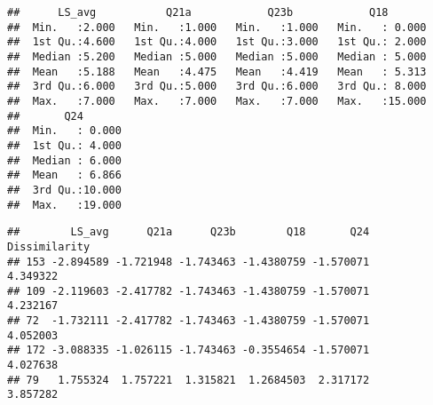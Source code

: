 \documentclass[
]{article}
\newenvironment{Shaded}{\begin{snugshade}}{\end{snugshade}}
\newcommand{\CommentTok}[1]{\textcolor[rgb]{0.56,0.35,0.01}{\textit{#1}}}
\newcommand{\DecValTok}[1]{\textcolor[rgb]{0.00,0.00,0.81}{#1}}
\newcommand{\FunctionTok}[1]{\textcolor[rgb]{0.00,0.00,0.00}{#1}}
\newcommand{\NormalTok}[1]{#1}
\newcommand{\OtherTok}[1]{\textcolor[rgb]{0.56,0.35,0.01}{#1}}
\newcommand{\SpecialCharTok}[1]{\textcolor[rgb]{0.00,0.00,0.00}{#1}}
\newcommand{\StringTok}[1]{\textcolor[rgb]{0.31,0.60,0.02}{#1}}
\begin{document}
\begin{verbatim}
##      LS_avg           Q21a            Q23b            Q18        
##  Min.   :2.000   Min.   :1.000   Min.   :1.000   Min.   : 0.000  
##  1st Qu.:4.600   1st Qu.:4.000   1st Qu.:3.000   1st Qu.: 2.000  
##  Median :5.200   Median :5.000   Median :5.000   Median : 5.000  
##  Mean   :5.188   Mean   :4.475   Mean   :4.419   Mean   : 5.313  
##  3rd Qu.:6.000   3rd Qu.:5.000   3rd Qu.:6.000   3rd Qu.: 8.000  
##  Max.   :7.000   Max.   :7.000   Max.   :7.000   Max.   :15.000  
##       Q24        
##  Min.   : 0.000  
##  1st Qu.: 4.000  
##  Median : 6.000  
##  Mean   : 6.866  
##  3rd Qu.:10.000  
##  Max.   :19.000
\end{verbatim}

\begin{Shaded}
\end{Shaded}

\begin{verbatim}
##        LS_avg      Q21a      Q23b        Q18       Q24 Dissimilarity
## 153 -2.894589 -1.721948 -1.743463 -1.4380759 -1.570071      4.349322
## 109 -2.119603 -2.417782 -1.743463 -1.4380759 -1.570071      4.232167
## 72  -1.732111 -2.417782 -1.743463 -1.4380759 -1.570071      4.052003
## 172 -3.088335 -1.026115 -1.743463 -0.3554654 -1.570071      4.027638
## 79   1.755324  1.757221  1.315821  1.2684503  2.317172      3.857282
\end{verbatim}
\end{document}
